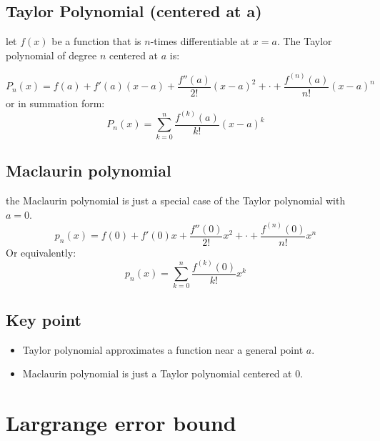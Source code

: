 \documentclass{article}
\begin{document}
                                \subsection{Taylor Polynomial (centered at a)}
                                    let \(f(x)\) be a function that is \(n\)-times differentiable at \(x = a\). 
                                    The Taylor polynomial of degree \(n\) centered at \(a\) is: 

                                        \[P_n(x) = f(a) + f'(a)(x - a) + \frac{f''(a)}{2!}{(x - a)}^{2} + \cdot + \frac{f^{(n)}(a)}{n!}{(x - a)}^{n}\]
                                    or in summation form: 
                                        \[P_n(x) = \sum_{k = 0}^{n} \frac{f^{(k)}(a)}{k!}{(x - a)}^k\]
                                
                                 \subsection{Maclaurin polynomial}
                                     the Maclaurin polynomial is just a special case of the Taylor polynomial with \(a = 0\).
                                        \[p_n(x) = f(0) + f'(0)x + \frac{f''(0)}{2!}x^2 + \cdot + \frac{f^{(n)}(0)}{n!} x^n\]
                                    Or equivalently: 
                                        \[p_n(x) = \sum_{k = 0}^{n} \frac{f^{(k)}(0)}{k!} x^k\]
                                 \subsection{Key point}
                                    \begin{itemize}
                                        \item Taylor polynomial approximates a function near a general point \(a\). 
                                        \item Maclaurin polynomial is just a Taylor polynomial centered at 0.
                                    \end{itemize}
                        \section{Largrange error bound} 
\end{document}
